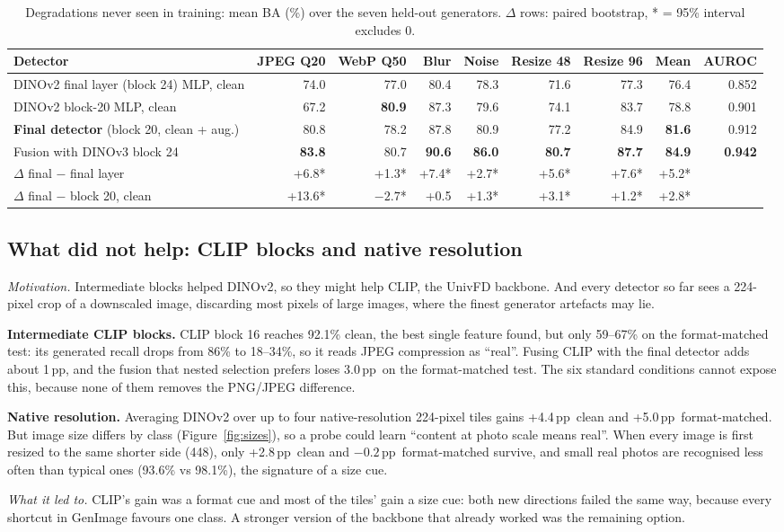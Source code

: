 \documentclass[10pt,a4paper]{article}
\newcommand{\best}[1]{\textbf{#1}}
\newcommand{\pp}{\,pp}
\newcommand{\why}[1]{\noindent\textit{\color{ntublue}Motivation.} #1\par}
\newcommand{\ledto}[1]{\par\noindent\textit{\color{ntublue}What it led to.} #1\par}
\begin{document}
\begin{table}[h]
\centering\footnotesize
\caption{Degradations never seen in training: mean BA (\%) over the seven held-out generators. $\Delta$ rows: paired bootstrap, * = 95\% interval excludes 0.}\label{tab:heldout}
\setlength{\tabcolsep}{4.2pt}
\begin{tabular}{@{}lrrrrrrrr@{}}
\toprule
Detector & JPEG Q20 & WebP Q50 & Blur & Noise & Resize 48 & Resize 96 & Mean & AUROC \\
\midrule
DINOv2 final layer (block 24) MLP, clean & 74.0 & 77.0 & 80.4 & 78.3 & 71.6 & 77.3 & 76.4 & 0.852 \\
DINOv2 block-20 MLP, clean & 67.2 & \best{80.9} & 87.3 & 79.6 & 74.1 & 83.7 & 78.8 & 0.901 \\
\textbf{Final detector} (block 20, clean + aug.) & 80.8 & 78.2 & 87.8 & 80.9 & 77.2 & 84.9 & \textbf{81.6} & 0.912 \\
Fusion with DINOv3 block 24 & \best{83.8} & 80.7 & \best{90.6} & \best{86.0} & \best{80.7} & \best{87.7} & \best{84.9} & \best{0.942} \\
\midrule
$\Delta$ final $-$ final layer & +6.8* & +1.3* & +7.4* & +2.7* & +5.6* & +7.6* & +5.2* & \\
$\Delta$ final $-$ block 20, clean & +13.6* & $-2.7$* & +0.5 & +1.3* & +3.1* & +1.2* & +2.8* & \\
\bottomrule
\end{tabular}
\end{table}

\subsection{What did not help: CLIP blocks and native resolution}\label{sec:res-negative}
\why{Intermediate blocks helped DINOv2, so they might help CLIP, the UnivFD backbone. And every detector so far sees a 224-pixel crop of a downscaled image, discarding most pixels of large images, where the finest generator artefacts may lie.}
\textbf{Intermediate CLIP blocks.} CLIP block 16 reaches 92.1\% clean, the best single feature found, but only 59--67\% on the format-matched test: its generated recall drops from 86\% to 18--34\%, so it reads JPEG compression as ``real''. Fusing CLIP with the final detector adds about 1\pp, and the fusion that nested selection prefers loses 3.0\pp\ on the format-matched test. The six standard conditions cannot expose this, because none of them removes the PNG/JPEG difference.

\textbf{Native resolution.} Averaging DINOv2 over up to four native-resolution 224-pixel tiles gains +4.4\pp\ clean and +5.0\pp\ format-matched. But image size differs by class (Figure~\ref{fig:sizes}), so a probe could learn ``content at photo scale means real''. When every image is first resized to the same shorter side (448), only +2.8\pp\ clean and $-0.2$\pp\ format-matched survive, and small real photos are recognised less often than typical ones (93.6\% vs 98.1\%), the signature of a size cue.
\ledto{CLIP's gain was a format cue and most of the tiles' gain a size cue: both new directions failed the same way, because every shortcut in GenImage favours one class. A stronger version of the backbone that already worked was the remaining option.}
\end{document}
